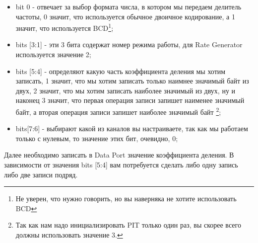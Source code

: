 \begin{itemize}
  \item bit 0 - отвечает за выбор формата числа, в котором мы передаем делитель
        частоты, 0 значит, что используется обычное двоичное кодирование, а
        1 значит, что используется BCD\footnote{Не уверен, что нужно говорить,
        но вы наверняка не хотите использовать BCD};
  \item bits [3:1] - эти 3 бита содержат номер режима работы, для Rate Generator
        используется значение 2;
  \item bits [5:4] - определяют какую часть коэффициента деления мы хотим
        записать, 1 значит, что мы хотим записать только наимнее значимый байт
        из двух, 2 значит, что мы хотим записать наиболее значимый из двух, ну
        и наконец 3 значит, что первая операция записи запишет наименее
        значимый байт, а вторая операция записи запишет наиболее значимый байт
        \footnote{Так как нам надо инициализировать PIT только один раз, вы
        скорее всего должны использовать значение 3.};
  \item bits[7:6] - выбирают какой из каналов вы настраиваете, так как мы
        работаем только с нулевым, то значение этих бит, очевидно, 0;
\end{itemize}

Далее необходимо записать в Data Port значение коэффициента деления. В
зависимости от значения bits [5:4] вам потребуется сделать либо одну запись
либо две записи подряд.

